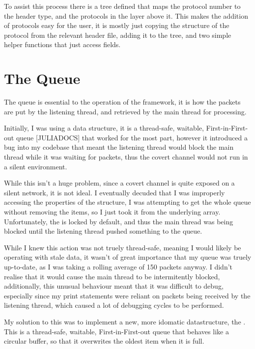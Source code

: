 To assist this process there is a tree defined that maps the protocol number to the header type, and the protocols in the layer above it. This makes the addition of protocols easy for the user, it is mostly just copying the structure of the protocol from the relevant header file, adding it to the tree, and two simple helper functions that just access fields.


\section{The Queue}
\label{sec:queue}

The queue is essential to the operation of the framework, it is how the packets are put by the listening thread, and retrieved by the main thread for processing.

Initially, I was using a  data structure, it is a thread-safe, waitable, First-in-First-out queue [JULIADOCS] that worked for the most part, however it introduced a bug into my codebase that meant the listening thread would block the main thread while it was waiting for packets, thus the covert channel would not run in a silent environment.

While this isn't a huge problem, since a covert channel is quite exposed on a silent network, it is not ideal. I eventually decuded that I was improperly accessing the properties of the structure, I was attempting to get the whole queue without removing the items, so I just took it from the underlying array. Unfortunately, the  is locked by default, and thus the main thread was being blocked until the listening thread pushed something to the queue.

While I knew this action was not truely thread-safe, meaning I would likely be operating with stale data, it wasn't of great importance that my queue was truely up-to-date, as I was taking a rolling average of 150 packets anyway. I didn't realise that it would cause the main thread to be intermitently blocked, additionally, this unusual behaviour meant that it was difficult to debug, especially since my print statements were reliant on packets being received by the listening thread, which caused a lot of debugging cycles to be performed.

My solution to this was to implement a new, more idomatic datastructure, the . This is a thread-safe, waitable, First-in-First-out queue that behaves like a circular buffer, so that it overwrites the oldest item when it is full.

